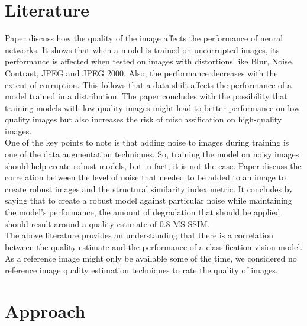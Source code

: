 \documentclass[10pt,twocolumn,letterpaper]{article}
\begin{document}

\section{Literature}
\label{section:literature}

Paper \cite{DodgeK16} discuss how the quality of the image affects the performance of neural networks. It shows that when a model is trained on uncorrupted images, its performance is affected when tested on images with distortions like Blur, Noise, Contrast, JPEG and JPEG 2000. Also, the performance decreases with the extent of corruption. This follows that a data shift affects the performance of a model trained in a distribution. The paper concludes with the possibility that training models with low-quality images might lead to better performance on low-quality images but also increases the risk of misclassification on high-quality images.\\

One of the key points to note is that adding noise to images during training is one of the data augmentation techniques. So, training the model on noisy images should help create robust models, but in fact, it is not the case. Paper \cite{akbiyik2020data} discuss the correlation between the level of noise that needed to be added to an image to create robust images and the structural similarity index metric. It concludes by saying that to create a robust model against particular noise while maintaining the model's performance, the amount of degradation that should be applied should result around a quality estimate of 0.8 MS-SSIM.\\

The above literature provides an understanding that there is a correlation between the quality estimate and the performance of a classification vision model. As a reference image might only be available some of the time, we considered no reference image quality estimation techniques to rate the quality of images.


\section{Approach}
\label{section:approach}
\end{document}
